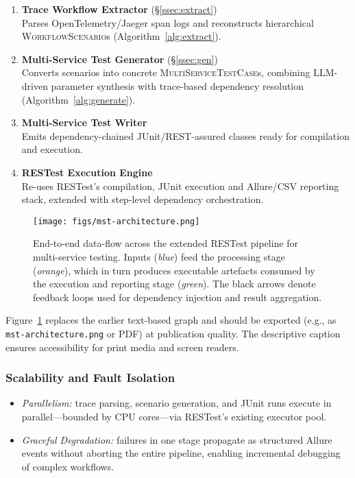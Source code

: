 \documentclass[conference]{IEEEtran}
\begin{document}
\begin{enumerate}[leftmargin=*]
  \item \textbf{Trace Workflow Extractor}  
        \hfill(\S\ref{ssec:extract})\\
        Parses OpenTelemetry/Jaeger span logs and reconstructs hierarchical
        \textsc{WorkflowScenario}s (Algorithm~\ref{alg:extract}).
  \item \textbf{Multi-Service Test Generator}  
        \hfill(\S\ref{ssec:gen})\\
        Converts scenarios into concrete \textsc{MultiServiceTestCase}s, combining
        LLM-driven parameter synthesis with trace-based dependency resolution
        (Algorithm~\ref{alg:generate}).
  \item \textbf{Multi-Service Test Writer}\\
        Emits dependency-chained JUnit/REST-assured classes ready for
        compilation and execution.
  \item \textbf{RESTest Execution Engine}\\
        Re-uses RESTest’s compilation, JUnit execution and Allure/CSV reporting
        stack, extended with step-level dependency orchestration.
\end{enumerate}

\begin{figure}[t]
  \centering
  \texttt{[image: figs/mst-architecture.png]}
  \caption{End-to-end data-flow across the extended RESTest pipeline for
           multi-service testing.  Inputs (\textit{blue}) feed the processing
           stage (\textit{orange}), which in turn produces executable artefacts
           consumed by the execution and reporting stage (\textit{green}).  The
           black arrows denote feedback loops used for dependency injection
           and result aggregation.}
  \label{fig:dataflow}
\end{figure}

\noindent%
Figure~\ref{fig:dataflow} replaces the earlier text-based graph and should be
exported (e.g., as \texttt{mst-architecture.png} or PDF) at publication
quality.  The descriptive caption ensures accessibility for print media and
screen readers.

\subsubsection*{Scalability and Fault Isolation}
\begin{itemize}[leftmargin=*]
  \item \emph{Parallelism:} trace parsing, scenario generation, and JUnit runs
        execute in parallel—bounded by CPU cores—via RESTest’s existing
        executor pool.
  \item \emph{Graceful Degradation:} failures in one stage propagate as
        structured Allure events without aborting the entire pipeline, enabling
        incremental debugging of complex workflows.
\end{itemize}
\end{document}
